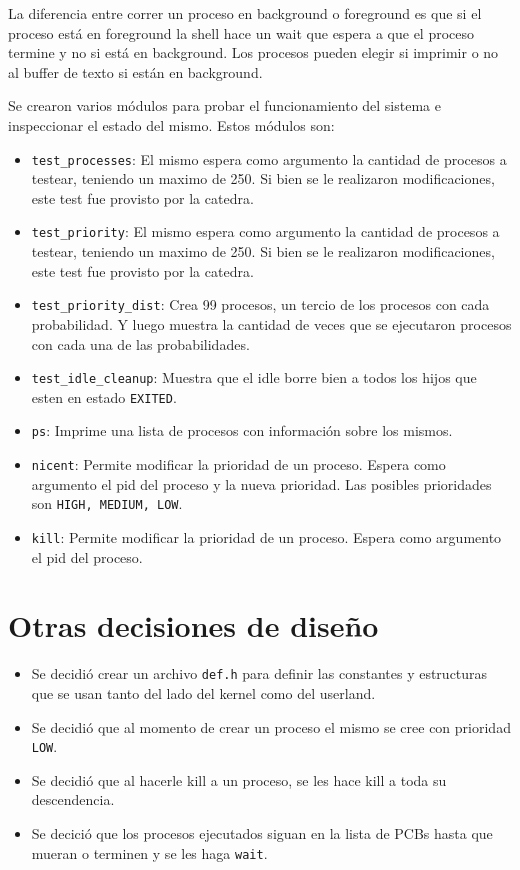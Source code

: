 \documentclass{article}
\begin{document}
La diferencia entre correr un proceso en background o foreground es que si el proceso está en foreground la shell hace un wait que espera a que el proceso termine y no si está en background. Los procesos pueden elegir si imprimir o no al buffer de texto si están en background.

Se crearon varios módulos para probar el funcionamiento del sistema e inspeccionar el estado del mismo. Estos módulos son:
\begin{itemize}
    \item \texttt{test\_processes}: El mismo espera como argumento la cantidad de procesos a testear, teniendo un maximo de 250. Si bien se le realizaron modificaciones, este test fue provisto por la catedra.
    \item \texttt{test\_priority}: El mismo espera como argumento la cantidad de procesos a testear, teniendo un maximo de 250. Si bien se le realizaron modificaciones, este test fue provisto por la catedra.
    \item \texttt{test\_priority\_dist}: Crea 99 procesos, un tercio de los procesos con cada probabilidad. Y luego muestra la cantidad de veces que se ejecutaron procesos con cada una de las probabilidades.
    \item \texttt{test\_idle\_cleanup}: Muestra que el idle borre bien a todos los hijos que esten en estado \texttt{EXITED}.
    \item \texttt{ps}: Imprime una lista de procesos con información sobre los mismos.
    \item \texttt{nicent}: Permite modificar la prioridad de un proceso. Espera como argumento el pid del proceso y la nueva prioridad. Las posibles prioridades son \texttt{HIGH, MEDIUM, LOW}.
    \item \texttt{kill}: Permite modificar la prioridad de un proceso. Espera como argumento el pid del proceso.
\end{itemize}

\section {Otras decisiones de diseño}
\begin{itemize}
    \item Se decidió crear un archivo \texttt{\texttt{def.h}} para definir las constantes y estructuras que se usan tanto del lado del kernel como del userland.
    \item Se decidió que al momento de crear un proceso el mismo se cree con prioridad \texttt{LOW}.
    \item Se decidió que al hacerle kill a un proceso, se les hace kill a toda su descendencia.
    \item Se decició que los procesos ejecutados siguan en la lista de PCBs hasta que mueran o terminen y se les haga \texttt{wait}.
\end{itemize}
\end{document}
